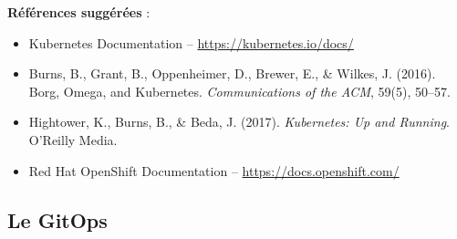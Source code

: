 \textbf{Références suggérées} :
\begin{itemize}
	\item Kubernetes Documentation – \url{https://kubernetes.io/docs/}
	\item Burns, B., Grant, B., Oppenheimer, D., Brewer, E., \& Wilkes, J. (2016). Borg, Omega, and Kubernetes. \textit{Communications of the ACM}, 59(5), 50–57.
	\item Hightower, K., Burns, B., \& Beda, J. (2017). \textit{Kubernetes: Up and Running}. O’Reilly Media.
	\item Red Hat OpenShift Documentation – \url{https://docs.openshift.com/}
\end{itemize}

\subsection{Le GitOps}

